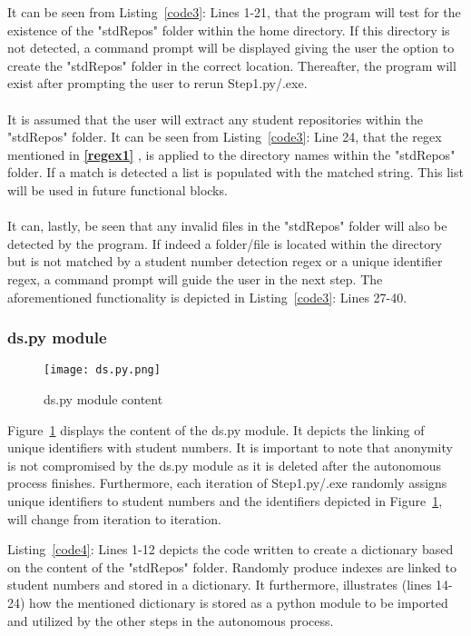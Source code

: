 It can be seen from Listing~\ref{code3}: Lines 1-21, that the program will test for the existence of the "stdRepos" folder within the home directory. If this directory is not detected, a command prompt will be displayed giving the user the option to create the "stdRepos" folder in the correct location. Thereafter, the program will exist after prompting the user to rerun Step1.py/.exe.
\\\\
It is assumed that the user will extract any student repositories within the "stdRepos" folder. It can be seen from Listing~\ref{code3}: Line 24, that the regex mentioned in \textbf{\ref{regex1} }, is applied to the directory names within the "stdRepos" folder. If a match is detected a list is populated with the matched string. This list will be used in future functional blocks. 
\\\\
It can, lastly, be seen that any invalid files in the "stdRepos" folder will also be detected by the program. If indeed a folder/file is located within the directory but is not matched by a student number detection regex or a unique identifier regex, a command prompt will guide the user in the next step. The aforementioned functionality is depicted in Listing~\ref{code3}: Lines 27-40.

\subsubsection{ds.py module}
\label{ds}
\begin{figure}[H]
\begin{center}
\texttt{[image: ds.py.png]}
\caption{ds.py module content}
\label{ds.pyCon}
\end{center}
\end{figure}

Figure~\ref{ds.pyCon} displays the content of the ds.py module. It depicts the linking of unique identifiers with student numbers. It is important to note that anonymity is not compromised by the ds.py module as it is deleted after the autonomous process finishes. Furthermore, each iteration of Step1.py/.exe randomly assigns unique identifiers to student numbers and the identifiers depicted in Figure~\ref{ds.pyCon}, will change from iteration to iteration. 



Listing~\ref{code4}: Lines 1-12 depicts the code written to create a dictionary based on the content of the "stdRepos" folder. Randomly produce indexes are linked to student numbers and stored in a dictionary. It furthermore, illustrates (lines 14-24) how the mentioned dictionary is stored as a python module to be imported and utilized by the other steps in the autonomous process. 

